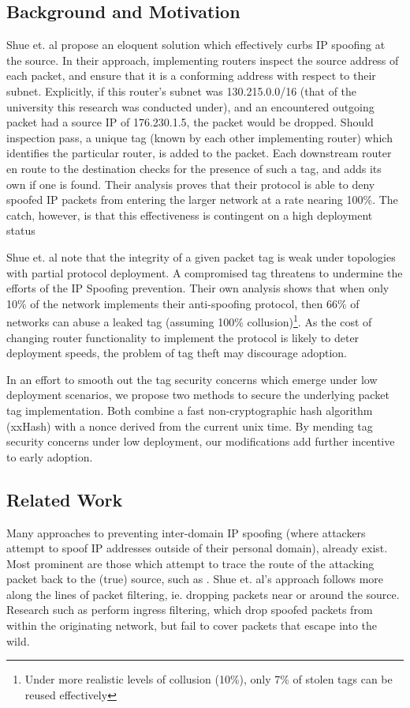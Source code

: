 \documentclass[12pt]{article} %
\begin{document}
\subsection{Background and Motivation}
Shue et. al propose an eloquent solution which effectively curbs IP spoofing at the source. In their approach, implementing routers inspect the source address of each packet, and ensure that it is a conforming address with respect to their subnet\cite{Shue20081567}. Explicitly, if this router's subnet was 130.215.0.0/16 (that of the university this research was conducted under), and an encountered outgoing packet had a source IP of 176.230.1.5, the packet would be dropped. Should inspection pass, a unique tag (known by each other implementing router) which identifies the particular router, is added to the packet. Each downstream router en route to the destination checks for the presence of such a tag, and adds its own if one is found. Their analysis proves that their protocol is able to deny spoofed IP packets from entering the larger network at a rate nearing 100\%. The catch, however, is that this effectiveness is contingent on a high deployment status

Shue et. al note that the integrity of a given packet tag is weak under topologies with partial protocol deployment. A compromised tag threatens to undermine the efforts of the IP Spoofing prevention. Their own analysis shows that when only 10\% of the network implements their anti-spoofing protocol, then 66\% of networks can abuse a leaked tag (assuming 100\% collusion)\cite{Shue20081567}\footnote{Under more realistic levels of collusion (10\%), only 7\% of stolen tags can be reused effectively}. As the cost of changing router functionality to implement the protocol is likely to deter deployment speeds, the problem of tag theft may discourage adoption.

In an effort to smooth out the tag security concerns which emerge under low deployment scenarios, we propose two methods to secure the underlying packet tag implementation. Both combine a fast non-cryptographic hash algorithm (xxHash) with a nonce derived from the current unix time. By mending tag security concerns under low deployment, our modifications add further incentive to early adoption.

\subsection{Related Work}
Many approaches to preventing inter-domain IP spoofing (where attackers attempt to spoof IP addresses outside of their personal domain), already exist. Most prominent are those which attempt to trace the route of the attacking packet back to the (true) source, such as \cite{Taylor}. Shue et. al's approach follows more along the lines of packet filtering, ie. dropping packets near or around the source. Research such as \cite{rfc2827} perform ingress filtering, which drop spoofed packets from within the originating network, but fail to cover packets that escape into the wild.
\end{document}
